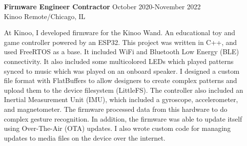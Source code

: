 \textbf{Firmware Engineer Contractor} \hfill October 2020-November 2022 \\
Kinoo \hfill Remote/Chicago, IL
\begin{description} \itemsep -2pt %
\item At Kinoo, I developed firmware for the Kinoo Wand. An educational toy and
game controller powered by an ESP32. This project was written in C++, and used
FreeRTOS as a base. It included WiFi and Bluetooth Low Energy (BLE)
connectivity. It also included some multicolored LEDs which played patterns
synced to music which was played on an onboard speaker. I designed a custom file
format with FlatBuffers to allow designers to create complex patterns and upload
them to the device filesystem (LittleFS). The controller also included an
Inertial Measurement Unit (IMU), which included a gyroscope, accelerometer, and
magnetometer. The firmware processed data from this hardware to do complex
gesture recognition. In addition, the firmware was able to update itself using
Over-The-Air (OTA) updates. I also wrote custom code for managing updates to
media files on the device over the internet.
\end{description}
